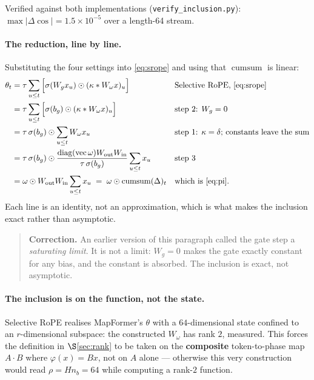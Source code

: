 \documentclass[11pt]{article}
\newcommand{\nb}{n_b}
\DeclareMathOperator*{\cumsum}{cumsum}
\begin{document}
\noindent Verified against both implementations
(\texttt{verify\_inclusion.py}): $\max|\Delta\cos| = 1.5\times10^{-5}$ over a
length-64 stream.

\paragraph{The reduction, line by line.} Substituting the four settings into
\eqref{eq:srope} and using that $\cumsum$ is linear:
\begin{align}
  \theta_t
  &= \tau\sum_{u\le t}\Big[\sigma(W_g x_u)\odot(\kappa * W_\omega x)_u\Big]
  && \text{Selective RoPE, \eqref{eq:srope}} \notag\\
  &= \tau\sum_{u\le t}\Big[\sigma(b_g)\odot(\kappa * W_\omega x)_u\Big]
  && \text{step 2: }W_g=0 \notag\\
  &= \tau\,\sigma(b_g)\odot\sum_{u\le t} W_\omega x_u
  && \text{step 1: }\kappa=\delta\text{; constants leave the sum} \notag\\
  &= \tau\,\sigma(b_g)\odot
     \frac{\operatorname{diag}(\operatorname{vec}\omega)W_{\mathrm{out}}W_{\mathrm{in}}}
          {\tau\,\sigma(b_g)}\sum_{u\le t}x_u
  && \text{step 3} \notag\\
  &= \omega\odot W_{\mathrm{out}}W_{\mathrm{in}}\sum_{u\le t}x_u
  \;=\;\omega\odot\cumsum(\Delta)_t
  && \text{which is \eqref{eq:pi}.}
\end{align}
Each line is an identity, not an approximation, which is what makes the inclusion
exact rather than asymptotic.

\begin{quote}\small
\textbf{Correction.} An earlier version of this paragraph called the gate step a
\emph{saturating limit}. It is not a limit: $W_g = 0$ makes the gate exactly
constant for any bias, and the constant is absorbed. The inclusion is exact, not
asymptotic.
\end{quote}

\paragraph{The inclusion is on the function, not the state.} Selective RoPE
realises MapFormer's $\theta$ with a $64$-dimensional state confined to an
$r$-dimensional subspace: the constructed $W_\omega$ has rank $2$, measured. This
forces the definition in $\S$\ref{sec:rank} to be taken on the \textbf{composite}
token-to-phase map $A\!\cdot\!B$ where $\varphi(x) = Bx$, not on $A$ alone ---
otherwise this very construction would read $\rho = H\nb = 64$ while computing a
rank-$2$ function.
\end{document}
